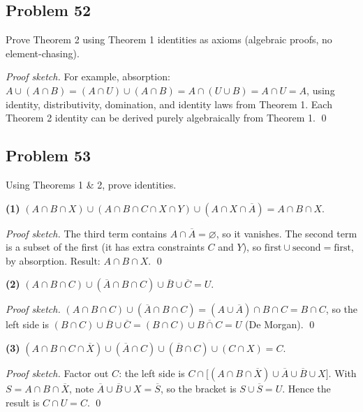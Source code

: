 \subsection*{Problem 52}
Prove Theorem 2 using Theorem 1 identities as axioms (algebraic proofs, no element-chasing).

\textit{Proof sketch.} For example, absorption: $A \cup (A \cap B) = (A \cap U) \cup (A \cap B) = A \cap (U \cup B) = A \cap U = A$, using identity, distributivity, domination, and identity laws from Theorem 1. Each Theorem 2 identity can be derived purely algebraically from Theorem 1. \qed

\subsection*{Problem 53}
Using Theorems 1 \& 2, prove identities.

\textbf{(1)} $(A \cap B \cap X) \cup (A \cap B \cap C \cap X \cap Y) \cup (A \cap X \cap \overline{A}) = A \cap B \cap X$.

\textit{Proof sketch.} The third term contains $A \cap \overline{A} = \varnothing$, so it vanishes. The second term is a subset of the first (it has extra constraints $C$ and $Y$), so $\text{first} \cup \text{second} = \text{first}$, by absorption. Result: $A \cap B \cap X$. \qed

\textbf{(2)} $(A \cap B \cap C) \cup (\overline{A} \cap B \cap C) \cup \overline{B} \cup \overline{C} = U$.

\textit{Proof sketch.} $(A \cap B \cap C) \cup (\overline{A} \cap B \cap C) = (A \cup \overline{A}) \cap B \cap C = B \cap C$, so the left side is $(B \cap C) \cup \overline{B} \cup \overline{C} = (B \cap C) \cup \overline{B \cap C} = U$ (De Morgan). \qed

\textbf{(3)} $(A \cap B \cap C \cap \overline{X}) \cup (\overline{A} \cap C) \cup (\overline{B} \cap C) \cup (C \cap X) = C$.

\textit{Proof sketch.} Factor out $C$: the left side is $C \cap \bigl[(A \cap B \cap \overline{X}) \cup \overline{A} \cup \overline{B} \cup X\bigr]$. With $S = A \cap B \cap \overline{X}$, note $\overline{A} \cup \overline{B} \cup X = \overline{S}$, so the bracket is $S \cup \overline{S} = U$. Hence the result is $C \cap U = C$. \qed

